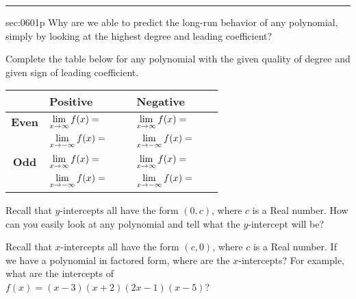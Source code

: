 \renewcommand{\columnseprule}{1.5pt}
\begin{multicols*}{2}
\rule[0.5\baselineskip]{0.4\textwidth}{1pt}
\noindent
{}\label{sec:0601p}
\begin{exercises}{sec:0601p}
\lab{} Why are we able to predict the long-run behavior of any polynomial, simply by looking at the highest degree and leading coefficient?

\vspace{2cm}
\lab{} Complete the table below for any polynomial with the given quality of degree and given sign of leading coefficient.

\noindent
\begin{tabular}{c | l | l}
	& \textbf{Positive} & \textbf{Negative} \\ \hline
	\textbf{Even} & $\displaystyle \lim_{x\rightarrow\infty}f(x)= \quad\quad\vspace{5mm} $ & $\displaystyle \lim_{x\rightarrow\infty}f(x)= \quad\quad\vspace{5mm} $\\
	& $\displaystyle \lim_{x\rightarrow-\infty}f(x)= \quad\quad\vspace{5mm} $& $\displaystyle \lim_{x\rightarrow-\infty}f(x)= \quad\quad\vspace{5mm} $\\ \hline
	\textbf{Odd} & $\displaystyle \lim_{x\rightarrow\infty}f(x)= \quad\quad\vspace{5mm} $ & $\displaystyle \lim_{x\rightarrow\infty}f(x)= \quad\quad\vspace{5mm} $ \\
	& $\displaystyle \lim_{x\rightarrow-\infty}f(x)= \quad\quad\vspace{5mm} $&$\displaystyle \lim_{x\rightarrow-\infty}f(x)= \quad\quad\vspace{5mm} $ \\
\end{tabular}  


\lab{} Recall that $y$-intercepts all have the form $(0,c)$, where $c$ is a Real number.  How can you easily look at any polynomial and tell what the $y$-intercept will be?

\vspace{2cm}
\lab{} Recall that $x$-intercepts all have the form $(c,0)$, where $c$ is a Real number.  If we have a polynomial in factored form, where are the $x$-intercepts?  For example, what are the intercepts of \\$f(x) = (x-3)(x+2)(2x-1)(x-5)$?


\end{exercises}
\end{multicols*}
